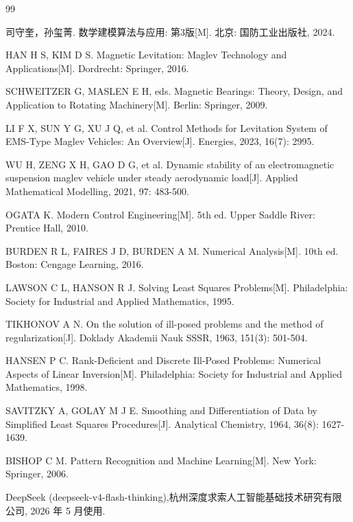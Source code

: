\documentclass[a4paper]{nmmcm}
\begin{document}
\begin{thebibliography}{99}

 司守奎，孙玺菁. 数学建模算法与应用: 第3版[M]. 北京: 国防工业出版社, 2024.

 HAN H S, KIM D S. Magnetic Levitation: Maglev Technology and Applications[M]. Dordrecht: Springer, 2016.

 SCHWEITZER G, MASLEN E H, eds. Magnetic Bearings: Theory, Design, and Application to Rotating Machinery[M]. Berlin: Springer, 2009.

 LI F X, SUN Y G, XU J Q, et al. Control Methods for Levitation System of EMS-Type Maglev Vehicles: An Overview[J]. Energies, 2023, 16(7): 2995.

 WU H, ZENG X H, GAO D G, et al. Dynamic stability of an electromagnetic suspension maglev vehicle under steady aerodynamic load[J]. Applied Mathematical Modelling, 2021, 97: 483-500.

 OGATA K. Modern Control Engineering[M]. 5th ed. Upper Saddle River: Prentice Hall, 2010.

 BURDEN R L, FAIRES J D, BURDEN A M. Numerical Analysis[M]. 10th ed. Boston: Cengage Learning, 2016.

 LAWSON C L, HANSON R J. Solving Least Squares Problems[M]. Philadelphia: Society for Industrial and Applied Mathematics, 1995.

 TIKHONOV A N. On the solution of ill-posed problems and the method of regularization[J]. Doklady Akademii Nauk SSSR, 1963, 151(3): 501-504.

 HANSEN P C. Rank-Deficient and Discrete Ill-Posed Problems: Numerical Aspects of Linear Inversion[M]. Philadelphia: Society for Industrial and Applied Mathematics, 1998.

 SAVITZKY A, GOLAY M J E. Smoothing and Differentiation of Data by Simplified Least Squares Procedures[J]. Analytical Chemistry, 1964, 36(8): 1627-1639.

 BISHOP C M. Pattern Recognition and Machine Learning[M]. New York: Springer, 2006.

 DeepSeek (deepseek-v4-flash-thinking),杭州深度求索人工智能基础技术研究有限公司, 2026 年 5 月使用.


\end{thebibliography}

\newpage
\thispagestyle{plain}
\end{document}

